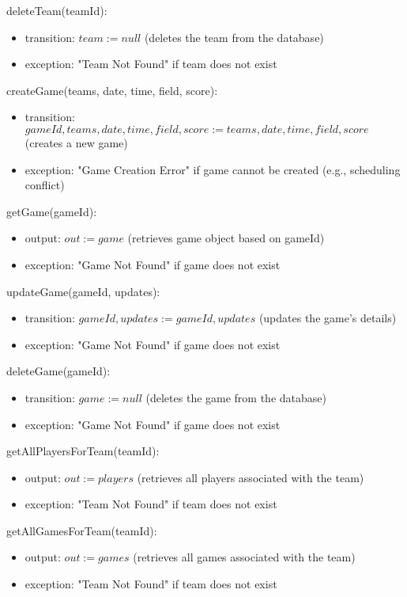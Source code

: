 \documentclass[12pt, titlepage]{article}
\begin{document}
\begin{itemize}
\noindent deleteTeam(teamId):
\begin{itemize}
  \item transition: $team := null$ (deletes the team from the database)
  \item exception: "Team Not Found" if team does not exist
\end{itemize}

\noindent createGame(teams, date, time, field, score):
\begin{itemize}
  \item transition: $gameId, teams, date, time, field, score := teams, date, time, field, score$ (creates a new game)
  \item exception: "Game Creation Error" if game cannot be created (e.g., scheduling conflict)
\end{itemize}

\noindent getGame(gameId):
\begin{itemize}
  \item output: $out := game$ (retrieves game object based on gameId)
  \item exception: "Game Not Found" if game does not exist
\end{itemize}

\noindent updateGame(gameId, updates):
\begin{itemize}
  \item transition: $gameId, updates := gameId, updates$ (updates the game's details)
  \item exception: "Game Not Found" if game does not exist
\end{itemize}

\noindent deleteGame(gameId):
\begin{itemize}
  \item transition: $game := null$ (deletes the game from the database)
  \item exception: "Game Not Found" if game does not exist
\end{itemize}

\noindent getAllPlayersForTeam(teamId):
\begin{itemize}
  \item output: $out := players$ (retrieves all players associated with the team)
  \item exception: "Team Not Found" if team does not exist
\end{itemize}

\noindent getAllGamesForTeam(teamId):
\begin{itemize}
  \item output: $out := games$ (retrieves all games associated with the team)
  \item exception: "Team Not Found" if team does not exist
\end{itemize}


\end{itemize}
\end{document}
